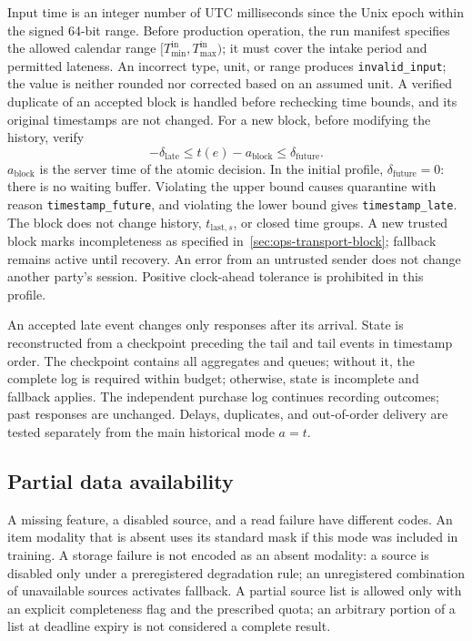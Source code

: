 \documentclass[12pt,a4paper]{article}
\newcommand{\code}[1]{{\ttfamily\small\nolinkurl{#1}}}
\theoremstyle{plainru}
\begin{document}
Input time is an integer number of UTC milliseconds since the Unix epoch
within the signed 64-bit range. Before production operation, the run manifest specifies
the allowed calendar range $[T_{\min}^{\mathrm{in}},T_{\max}^{\mathrm{in}})$;
it must cover the intake period and permitted lateness.
An incorrect type, unit, or range produces \code{invalid_input};
the value is neither rounded nor corrected based on an assumed unit.
A verified duplicate of an accepted block is handled before rechecking
time bounds, and its original timestamps are not changed.
For a new block, before modifying the history, verify
\begin{equation}\label{eq:ops-event-time-window}
-\delta_{\mathrm{late}}\le t(e)-a_{\mathrm{block}}
\le\delta_{\mathrm{future}}.
\end{equation}
$a_{\mathrm{block}}$ is the server time of the atomic decision.
In the initial profile, $\delta_{\mathrm{future}}=0$: there is no waiting buffer.
Violating the upper bound causes quarantine with reason \code{timestamp_future},
and violating the lower bound gives \code{timestamp_late}. The block does not change history,
$t_{\mathrm{last},s}$, or closed time groups. A new trusted
block marks incompleteness as specified in~\ref{sec:ops-transport-block};
fallback remains active until recovery. An error from an untrusted sender
does not change another party's session. Positive clock-ahead tolerance is prohibited in this profile.

An accepted late event changes only responses after its arrival.
State is reconstructed from a checkpoint preceding the tail
and tail events in timestamp order. The checkpoint contains all aggregates and queues;
without it, the complete log is required within budget; otherwise, state is incomplete and fallback applies.
The independent purchase log continues recording outcomes; past responses are unchanged.
Delays, duplicates, and out-of-order delivery are tested separately
from the main historical mode \(a=t\).

\subsection{Partial data availability}\label{sec:ops-partial-data}

A missing feature, a disabled source, and a read failure have
different codes. An item modality that is absent uses its standard
mask if this mode was included in training. A storage failure
is not encoded as an absent modality: a source is disabled only
under a preregistered degradation rule; an unregistered
combination of unavailable sources activates fallback. A partial source list
is allowed only with an explicit completeness flag and the prescribed quota;
an arbitrary portion of a list at deadline expiry is not considered a complete result.
\end{document}
